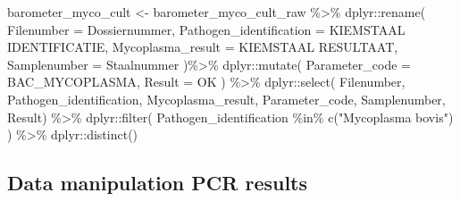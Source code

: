 \documentclass[
]{article}
\newenvironment{Shaded}{\begin{snugshade}}{\end{snugshade}}
\newcommand{\AttributeTok}[1]{\textcolor[rgb]{0.77,0.63,0.00}{#1}}
\newcommand{\FunctionTok}[1]{\textcolor[rgb]{0.00,0.00,0.00}{#1}}
\newcommand{\NormalTok}[1]{#1}
\newcommand{\OtherTok}[1]{\textcolor[rgb]{0.56,0.35,0.01}{#1}}
\newcommand{\SpecialCharTok}[1]{\textcolor[rgb]{0.00,0.00,0.00}{#1}}
\newcommand{\StringTok}[1]{\textcolor[rgb]{0.31,0.60,0.02}{#1}}
\begin{document}
\begin{Shaded}
\begin{Highlighting}[]
\NormalTok{barometer\_myco\_cult }\OtherTok{\textless{}{-}}\NormalTok{ barometer\_myco\_cult\_raw }\SpecialCharTok{\%\textgreater{}\%}
\NormalTok{  dplyr}\SpecialCharTok{::}\FunctionTok{rename}\NormalTok{(}
    \AttributeTok{Filenumber =}\NormalTok{ Dossiernummer,}
    \AttributeTok{Pathogen\_identification =} \StringTok{\textquotesingle{}KIEMSTAAL IDENTIFICATIE\textquotesingle{}}\NormalTok{,}
    \AttributeTok{Mycoplasma\_result =} \StringTok{\textquotesingle{}KIEMSTAAL RESULTAAT\textquotesingle{}}\NormalTok{,}
    \AttributeTok{Samplenumber =} \StringTok{\textquotesingle{}Staalnummer\textquotesingle{}}
\NormalTok{  )}\SpecialCharTok{\%\textgreater{}\%}
\NormalTok{  dplyr}\SpecialCharTok{::}\FunctionTok{mutate}\NormalTok{(}
    \AttributeTok{Parameter\_code =} \StringTok{\textquotesingle{}BAC\_MYCOPLASMA\textquotesingle{}}\NormalTok{,}
    \AttributeTok{Result =} \StringTok{\textquotesingle{}OK\textquotesingle{}}
\NormalTok{  ) }\SpecialCharTok{\%\textgreater{}\%}
\NormalTok{  dplyr}\SpecialCharTok{::}\FunctionTok{select}\NormalTok{(}
\NormalTok{    Filenumber,}
\NormalTok{    Pathogen\_identification,}
\NormalTok{    Mycoplasma\_result,}
\NormalTok{    Parameter\_code,}
\NormalTok{    Samplenumber,}
\NormalTok{    Result)  }\SpecialCharTok{\%\textgreater{}\%}
\NormalTok{  dplyr}\SpecialCharTok{::}\FunctionTok{filter}\NormalTok{(}
\NormalTok{    Pathogen\_identification }\SpecialCharTok{\%in\%} \FunctionTok{c}\NormalTok{(}\StringTok{"Mycoplasma bovis"}\NormalTok{)}
\NormalTok{  ) }\SpecialCharTok{\%\textgreater{}\%}
\NormalTok{  dplyr}\SpecialCharTok{::}\FunctionTok{distinct}\NormalTok{()}
\end{Highlighting}
\end{Shaded}

\hypertarget{data-manipulation-pcr-results}{%
\subsection{Data manipulation PCR
results}\label{data-manipulation-pcr-results}}
\end{document}
